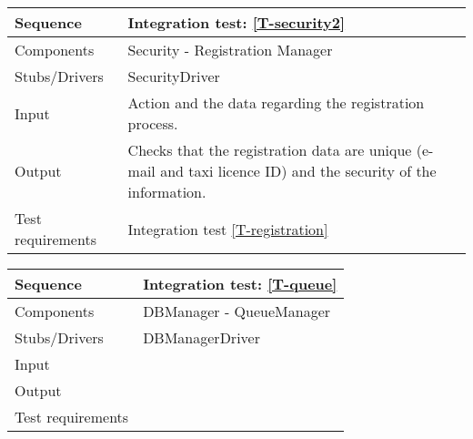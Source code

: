\begin{table}[H]
    \begin{tabularx}{\textwidth}{l|X}
        \hline
        Sequence
        & 
        Integration test: \ref{T-security2}
        \\ \hline
        Components 
        & 
        Security - Registration Manager
        \\ \hline
        Stubs/Drivers 
        & 
        SecurityDriver
        \\ \hline
        Input 
        & 
        Action and the data regarding the registration process. 
        \\ \hline
        Output 
        & 
        Checks that the registration data are unique (e-mail and taxi licence ID) and the security of the information.
        \\ \hline
        Test requirements 
        & 
        Integration test \ref{T-registration}
        \\ \hline
    \end{tabularx}
\end{table}

\begin{table}[H]
    \begin{tabularx}{\textwidth}{l|X}
        \hline
        Sequence
        & 
        Integration test: \ref{T-queue}
        \\ \hline
        Components 
        & 
        DBManager - QueueManager
        \\ \hline
        Stubs/Drivers 
        & 
        DBManagerDriver
        \\ \hline
        Input 
        & 
       
        \\ \hline
        Output 
        & 
        
        \\ \hline
        Test requirements 
        & 
        
        \\ \hline
    \end{tabularx}
\end{table}

